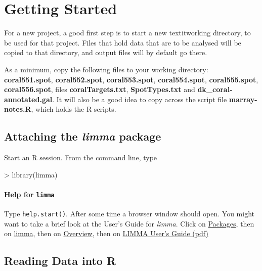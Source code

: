 \documentclass[a4paper,9pt]{article}
\begin{document}
\section{Getting Started}

For a new project, a good first step is to start a new textit{working
  directory}, to be used for that project.  Files that hold data that
are to be analysed will be copied to that directory,
and output files will by default go there.

As a minimum, copy the following files to your working
directory: \textbf{coral551.spot}, \textbf{coral552.spot},
\textbf{coral553.spot}, \textbf{coral554.spot},
\textbf{coral555.spot}, \textbf{coral556.spot}, files
\textbf{coralTargets.txt}, \textbf{SpotTypes.txt} and
\textbf{dk\_coral-annotated.gal}.  It will also be a good idea to copy
across the script file \textbf{marray-notes.R}, which holds the R
scripts.


\subsection*{Attaching the \textit{limma} package}

Start an R session.  From the command line, type
\begin{Schunk}
\begin{Sinput}
> library(limma)
\end{Sinput}
\end{Schunk}

\paragraph{Help for \texttt{limma}}

Type \texttt{help.start()}.  After some time a browser window should
open.  You might want to take a brief look at the User's Guide for
\textit{limma}.  Click on \underline{Packages}, then on
\underline{limma}, then on \underline{Overview}, then on
\underline{LIMMA User's Guide (pdf)}

\subsection{Reading Data into R}
\end{document}
